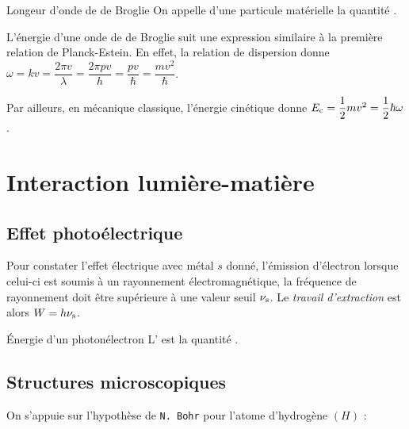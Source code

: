 \documentclass[a4paper,french,bookmarks]{article}
\begin{document}
\begin{definition}{Longeur d'onde de de Broglie}{}
    On appelle  d'une particule matérielle la quantité .
\end{definition}

\begin{hpnote}
    L'énergie d'une onde de de Broglie suit une expression similaire à la première relation de Planck-Estein. En effet, la relation de dispersion donne $\omega = kv = \dfrac{2\pi v}{\lambda} = \dfrac{2\pi pv}{h} = \dfrac{pv}{\hbar} = \dfrac{mv^2}{\hbar}$. 
    
    Par ailleurs, en mécanique classique, l'énergie cinétique donne $E_\text c = \dfrac{1}{2}mv^2 = \dfrac{1}{2}\hbar\omega$.
\end{hpnote}

\section{Interaction lumière-matière}

\subsection{Effet photoélectrique}

Pour constater l'effet électrique avec métal $s$ donné, \ie l'émission d'électron lorsque celui-ci est soumis à un rayonnement électromagnétique, la fréquence de rayonnement doit être supérieure à une valeur seuil $\nu_\text s$. Le \textit{travail d'extraction} est alors $W = h\nu_\text s$.

\begin{property}{Énergie d'un photonélectron}{}
    L' est la quantité .
\end{property}

\subsection{Structures microscopiques}

On s'appuie sur l'hypothèse de \texttt{N. Bohr} pour l'atome d'hydrogène $(H)$ :
\end{document}

